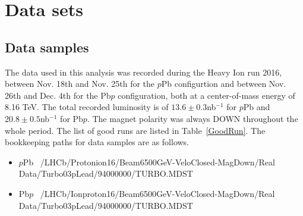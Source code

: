\section{Data sets}
\label{Data and Monte Carlo samples}
\subsection{Data samples}
The data used in this analysis was recorded during the Heavy Ion run 2016, between Nov. 18th and Nov. 25th for the $p$Pb configurtion and between Nov. 26th and Dec. 4th for the Pb$p$ configuration, both at a center-of-mass energy of 8.16 TeV. The total recorded luminosity is of $13.6\pm0.3$nb$^{-1}$ for $p$Pb and $20.8\pm0.5$nb$^{-1}$ for Pb$p$. The magnet polarity was always DOWN throughout the whole period. The list of good runs are listed in Table~\ref{GoodRun}. The bookkeeping paths for data samples are as follows.
\begin{itemize}
\item $p$Pb \  /LHCb/Protonion16/Beam6500GeV-VeloClosed-MagDown/Real Data/Turbo03pLead/94000000/TURBO.MDST
\item Pb$p$ \ /LHCb/Ionproton16/Beam6500GeV-VeloClosed-MagDown/Real Data/Turbo03pLead/94000000/TURBO.MDST
\end{itemize}
